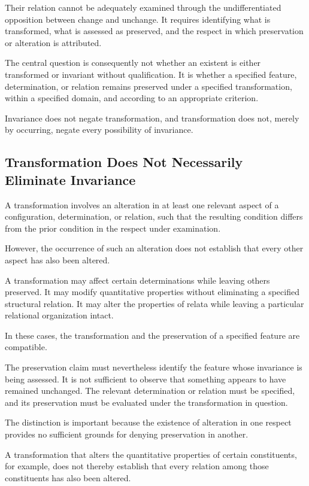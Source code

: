 Their relation cannot be adequately examined through
the undifferentiated opposition between change and
unchange. It requires identifying what is transformed,
what is assessed as preserved, and the respect in which
preservation or alteration is attributed.

The central question is consequently not whether an
existent is either transformed or invariant without
qualification. It is whether a specified feature,
determination, or relation remains preserved under
a specified transformation, within a specified domain,
and according to an appropriate criterion.

Invariance does not negate transformation, and
transformation does not, merely by occurring, negate
every possibility of invariance.

\subsection{Transformation Does Not Necessarily Eliminate Invariance}

A transformation involves an alteration in at least
one relevant aspect of a configuration, determination,
or relation, such that the resulting condition differs
from the prior condition in the respect under examination.

However, the occurrence of such an alteration does not
establish that every other aspect has also been altered.

A transformation may affect certain determinations
while leaving others preserved. It may modify quantitative
properties without eliminating a specified structural
relation. It may alter the properties of relata while
leaving a particular relational organization intact.

In these cases, the transformation and the preservation
of a specified feature are compatible.

The preservation claim must nevertheless identify
the feature whose invariance is being assessed. It is
not sufficient to observe that something appears to
have remained unchanged. The relevant determination
or relation must be specified, and its preservation
must be evaluated under the transformation in question.

The distinction is important because the existence
of alteration in one respect provides no sufficient
grounds for denying preservation in another.

A transformation that alters the quantitative properties
of certain constituents, for example, does not thereby
establish that every relation among those constituents
has also been altered.

